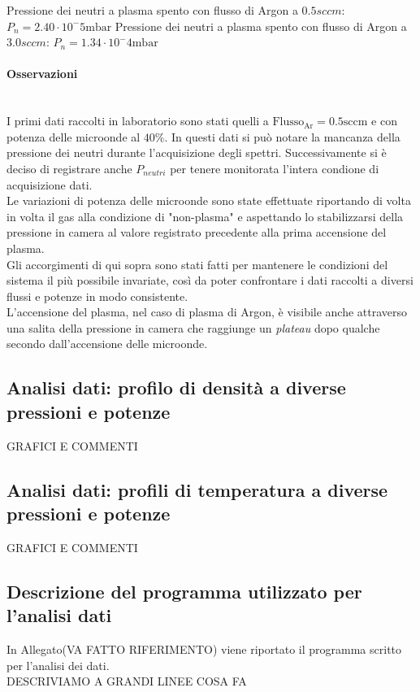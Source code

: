 Pressione dei neutri a plasma spento con flusso di Argon a $0.5sccm$: $P_n=2.40\cdot10^-5\si{\milli\bar}$
Pressione dei neutri a plasma spento con flusso di Argon a $3.0sccm$: $P_n=1.34\cdot10^-4\si{\milli\bar}$

\paragraph{Osservazioni} ~\\
I primi dati raccolti in laboratorio sono stati quelli a $\text{Flusso}_\text{Ar}=0.5\text{sccm}$ e con potenza delle microonde al $40\%$. In questi dati si può notare la mancanza della pressione dei neutri durante l'acquisizione degli spettri. Successivamente si è deciso di registrare anche $P_{neutri}$ per tenere monitorata l'intera condione di acquisizione dati.\\
Le variazioni di potenza delle microonde sono state effettuate riportando di volta in volta il gas alla condizione di "non-plasma" e aspettando lo stabilizzarsi della pressione in camera al valore registrato precedente alla prima accensione del plasma.\\
Gli accorgimenti di qui sopra sono stati fatti per mantenere le condizioni del sistema il più possibile invariate, così da poter confrontare i dati raccolti a diversi flussi e potenze in modo consistente.\\
L'accensione del plasma, nel caso di plasma di Argon, è visibile anche attraverso una salita della pressione in camera che raggiunge un \textit{plateau} dopo qualche secondo dall'accensione delle microonde.

\subsection{Analisi dati: profilo di densità a diverse pressioni e potenze}

GRAFICI E COMMENTI
\subsection{Analisi dati: profili di temperatura a diverse pressioni e potenze}

GRAFICI E COMMENTI

\subsection{Descrizione del programma utilizzato per l'analisi dati}
In Allegato(VA FATTO RIFERIMENTO) viene riportato il programma scritto per l'analisi dei dati.\\
DESCRIVIAMO A GRANDI LINEE COSA FA



